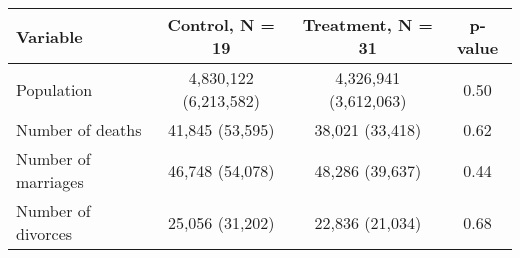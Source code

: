 
\begin{tabular}{lccc}
\toprule
Variable & Control, N = 19 & Treatment, N = 31 & p-value\\
\midrule
Population & 4,830,122 (6,213,582) & 4,326,941 (3,612,063) & 0.50\\
Number of deaths & 41,845 (53,595) & 38,021 (33,418) & 0.62\\
Number of marriages & 46,748 (54,078) & 48,286 (39,637) & 0.44\\
Number of divorces & 25,056 (31,202) & 22,836 (21,034) & 0.68\\
\bottomrule
\end{tabular}